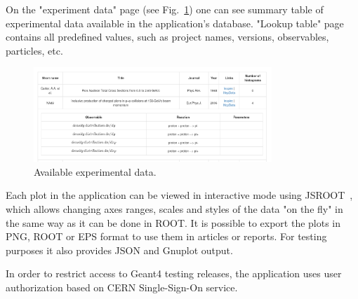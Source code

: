On the "experiment data" page (see Fig.~\ref{fig:exppage}) one can see summary table of experimental data available in the application's database.
"Lookup table" page contains all predefined values, such as project names, versions, observables, particles, etc.

\begin{figure}[h]
    \centering
    \includegraphics[width=0.8\textwidth,clip]{expdata.png}
    \caption{Available experimental data.}
    \label{fig:exppage}
\end{figure}

Each plot in the application can be viewed in interactive mode using JSROOT~\cite{JSROOT}, which allows changing axes ranges, scales and styles of the data "on the fly" in the same way as it can be done in ROOT. It is possible to export the plots in PNG, ROOT or EPS format to use them in articles or reports. For testing purposes it also provides JSON and Gnuplot output.

In order to restrict access to Geant4 testing releases, the application uses user authorization based on CERN Single-Sign-On service.




